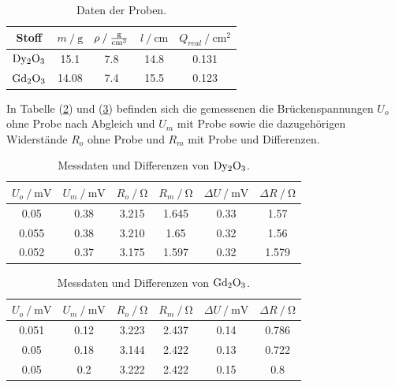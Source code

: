 \begin{table}
    \centering
    \caption{Daten der Proben.}
    \begin{tabular}{c c c c c}
        \toprule
        {Stoff} & {$m \mathbin{/} \si{\gram}$} & {$\rho \mathbin{/} \si[per-mode=fraction]{\gram\per\cubic\centi\meter}$} & {$l \mathbin{/} \si{\centi\meter}$} & {$Q_{real} \mathbin{/} \si{\centi\meter\squared}$} \\
    \midrule
    $\ce{Dy2O3}$ & 15.1  & 7.8 & 14.8 & 0.131 \\
    $\ce{Gd2O3}$ & 14.08 & 7.4 & 15.5 & 0.123 \\
    \bottomrule
\end{tabular}
\label{tab:proben}
\end{table}

\noindent
In Tabelle (\ref{tab:exp1}) und (\ref{tab:exp2}) befinden sich die gemessenen die Brückenspannungen $U_o$ ohne Probe nach Abgleich und $U_m$ mit Probe sowie die dazugehörigen Widerstände
$R_o$ ohne Probe und $R_m$ mit Probe und Differenzen. 

\begin{table}
    \centering
    \caption{Messdaten und Differenzen von $\ce{Dy2O3}$.}
    \begin{tabular}{c c c c c c}
        \toprule
        {$U_o \mathbin{/} \si{\milli\volt}$} & {$U_m \mathbin{/} \si{\milli\volt}$} & {$R_o \mathbin{/} \si{\ohm}$} & {$R_m \mathbin{/} \si{\ohm}$} & {$\Delta U \mathbin{/} \si{\milli\volt}$} & {$\Delta R \mathbin{/} \si{\ohm}$} \\
    \midrule
    0.05     &   0.38   &     3.215     &     1.645    &   0.33  &  1.57  \\
    0.055    &   0.38   &     3.210     &     1.65     &   0.32  &  1.56  \\ 
    0.052    &   0.37   &     3.175     &     1.597    &   0.32  &  1.579 \\
    \bottomrule
\end{tabular}
\label{tab:exp1}
\end{table}

\begin{table}
    \centering
    \caption{Messdaten und Differenzen von $\ce{Gd2O3}$.}
    \begin{tabular}{c c c c c c}
        \toprule
        {$U_o \mathbin{/} \si{\milli\volt}$} & {$U_m \mathbin{/} \si{\milli\volt}$} & {$R_o \mathbin{/} \si{\ohm}$} & {$R_m \mathbin{/} \si{\ohm}$} & {$\Delta U \mathbin{/} \si{\milli\volt}$} & {$\Delta R \mathbin{/} \si{\ohm}$} \\
    \midrule
    0.051    &   0.12   &     3.223     &     2.437    &   0.14  &  0.786  \\
    0.05     &   0.18   &     3.144     &     2.422    &   0.13  &  0.722  \\ 
    0.05     &   0.2    &     3.222     &     2.422    &   0.15  &  0.8    \\
    \bottomrule
\end{tabular}
\label{tab:exp2}
\end{table}

